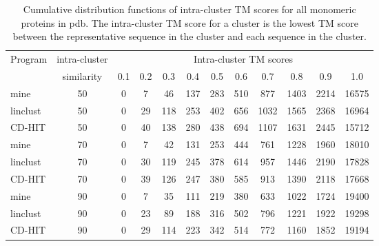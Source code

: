 \documentclass[]{article}
\begin{document}
\begin{table}%
\centering
\caption{Cumulative distribution functions of intra-cluster TM scores for all monomeric proteins in pdb. The intra-cluster TM score for a cluster is the lowest TM score between the representative sequence in the cluster and each sequence in the cluster.}

\begin{tabular}{l c c c c c c c c c c c}
\toprule
Program & intra-cluster & \multicolumn{10}{c}{Intra-cluster TM scores} \\
        & similarity & 0.1 & 0.2 & 0.3 & 0.4 & 0.5 & 0.6 & 0.7 & 0.8 & 0.9 & 1.0 \\
\midrule

mine     & 50 & 0 & 7 & 46 & 137 & 283 & 510 & 877 & 1403 & 2214 & 16575 \\
linclust & 50 & 0 & 29 & 118 & 253 & 402 & 656 & 1032 & 1565 & 2368 & 16964 \\
CD-HIT   & 50 & 0 & 40 & 138 & 280 & 438 & 694 & 1107 & 1631 & 2445 & 15712 \\

mine     & 70 & 0 & 7 & 42 & 131 & 253 & 444 & 761 & 1228 & 1960 & 18010 \\
linclust & 70 & 0 & 30 & 119 & 245 & 378 & 614 & 957 & 1446 & 2190 & 17828 \\
CD-HIT   & 70 & 0 & 39 & 126 & 247 & 380 & 585 & 913 & 1390 & 2118 & 17668 \\

mine     & 90 & 0 & 7 & 35 & 111 & 219 & 380 & 633 & 1022 & 1724 & 19400 \\
linclust & 90 & 0 & 23 & 89 & 188 & 316 & 502 & 796 & 1221 & 1922 & 19298 \\
CD-HIT   & 90 & 0 & 29 & 114 & 223 & 342 & 514 & 772 & 1160 & 1852 & 19194 \\

\bottomrule
\end{tabular}
\end{table}
\end{document}

